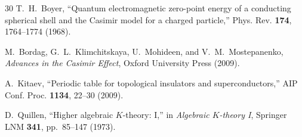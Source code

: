 \documentclass[aps,prd,twocolumn,superscriptaddress,nofootinbib]{revtex4-2}
\begin{document}
\begin{thebibliography}{30}
T.~H.~Boyer,
``Quantum electromagnetic zero-point energy of a conducting
spherical shell and the Casimir model for a charged particle,''
Phys. Rev. \textbf{174}, 1764--1774 (1968).

M.~Bordag, G.~L.~Klimchitskaya, U.~Mohideen, and V.~M.~Mostepanenko,
\emph{Advances in the Casimir Effect},
Oxford University Press (2009).

A.~Kitaev,
``Periodic table for topological insulators and superconductors,''
AIP Conf. Proc. \textbf{1134}, 22--30 (2009).

D.~Quillen,
``Higher algebraic $K$-theory: I,''
in \emph{Algebraic $K$-theory I}, Springer LNM \textbf{341},
pp.~85--147 (1973).

\end{thebibliography}
\end{document}
